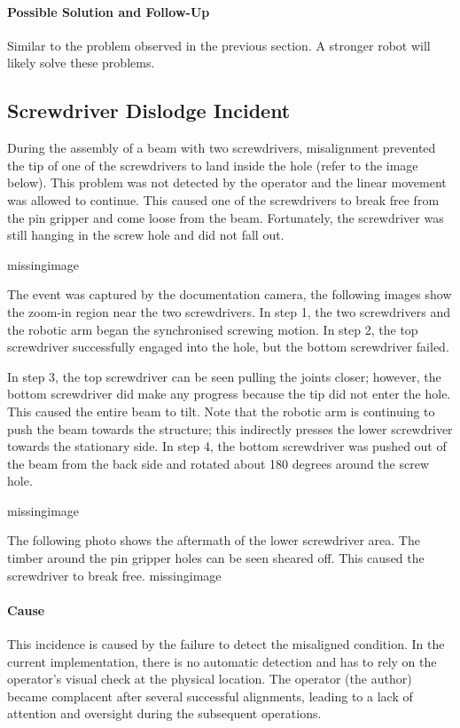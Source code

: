 \paragraph{Possible Solution and Follow-Up}
Similar to the problem observed in the previous section. A stronger robot will likely solve these problems.

\subsection{Screwdriver Dislodge Incident}
\label{subsection:exploration_4_screwdriver_dislodge_incident}

During the assembly of a beam with two screwdrivers, misalignment prevented the tip of one of the screwdrivers to land inside the hole (refer to the image below). This problem was not detected by the operator and the linear movement was allowed to continue. This caused one of the screwdrivers to break free from the pin gripper and come loose from the beam. Fortunately, the screwdriver was still hanging in the screw hole and did not fall out.

missingimage

The event was captured by the documentation camera, the following images show the zoom-in region near the two screwdrivers. In step 1, the two screwdrivers and the robotic arm began the synchronised screwing motion. In step 2, the top screwdriver successfully engaged into the hole, but the bottom screwdriver failed. 

In step 3, the top screwdriver can be seen pulling the joints closer; however, the bottom screwdriver did make any progress because the tip did not enter the hole. This caused the entire beam to tilt. Note that the robotic arm is continuing to push the beam towards the structure; this indirectly presses the lower screwdriver towards the stationary side. In step 4, the bottom screwdriver was pushed out of the beam from the back side and rotated about 180 degrees around the screw hole. 

missingimage

The following photo shows the aftermath of the lower screwdriver area. The timber around the pin gripper holes can be seen sheared off. This caused the screwdriver to break free.
missingimage

\paragraph{Cause}
This incidence is caused by the failure to detect the misaligned condition. In the current implementation, there is no automatic detection and has to rely on the operator’s visual check at the physical location. 
The operator (the author) became complacent after several successful alignments, leading to a lack of attention and oversight during the subsequent operations.

